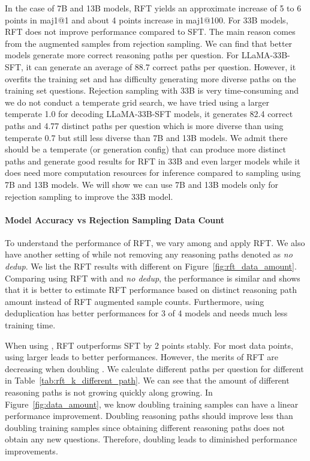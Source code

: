 \documentclass{article} \usepackage{iclr2021_conference,times}
\begin{document}
In the case of 7B and 13B models, RFT yields an approximate increase of 5 to 6 points in maj1@1 and about 4 points increase in maj1@100.
For 33B models, RFT does not improve performance compared to SFT.
The main reason comes from the augmented samples from rejection sampling. 
We can find that better models generate more correct reasoning paths per question.
For LLaMA-33B-SFT, it can generate an average of 88.7 correct paths per question. However, it overfits the training set and has difficulty generating more diverse paths on the training set questions. 
Rejection sampling with 33B is very time-consuming and we do not conduct a temperate grid search, we have tried using a larger temperate 1.0 for decoding LLaMA-33B-SFT models, it generates 82.4 correct paths and 4.77 distinct paths per question which is more diverse than using temperate 0.7 but still less diverse than 7B and 13B models. 
We admit there should be a temperate (or generation config) that can produce more distinct paths and generate good results for RFT in 33B and even larger models while it does need more computation resources for inference compared to sampling using 7B and 13B models.
We will show we can use 7B and 13B models only for rejection sampling to improve the 33B model.


\paragraph{Model Accuracy vs Rejection Sampling Data Count}



To understand the performance of RFT, we vary  among  and apply RFT. We also have another setting of  while not removing any reasoning paths denoted as \textit{no dedup}. We list the RFT results with different  on Figure~\ref{fig:rft_data_amount}.
Comparing using RFT with  and \textit{no dedup}, the performance is similar and shows that it is better to estimate RFT performance based on distinct reasoning path amount instead of RFT augmented sample counts.
Furthermore, using deduplication has better performances for 3 of 4 models and needs much less training time. 

When using , RFT outperforms SFT by 2 points stably.
For most data points, using larger  leads to better performances.
However, the merits of RFT are decreasing when doubling .
We calculate different paths per question for different  in Table~\ref{tab:rft_k_different_path}. We can see that the amount of different reasoning paths is not growing quickly along  growing. In Figure~\ref{fig:data_amount}, we know doubling training samples can have a linear performance improvement. Doubling reasoning paths should improve less than doubling training samples since obtaining different reasoning paths does not obtain any new questions. Therefore, doubling  leads to diminished performance improvements.
\end{document}
